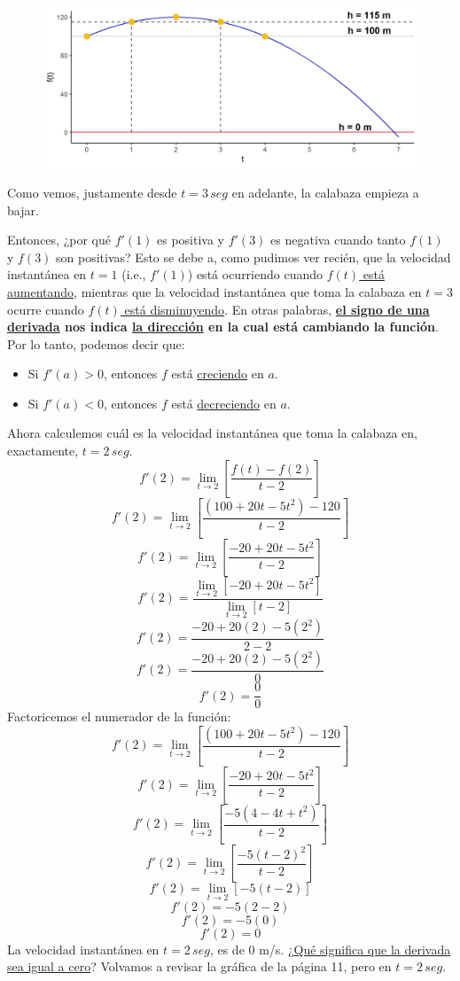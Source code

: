 \documentclass[12pt]{article}
\begin{document}
\begin{figure}[hbt!]
\centering
\includegraphics[scale=0.7]{img/tirar_calabaza_plot.jpg}
\end{figure}

Como vemos, justamente desde $t = 3 \, seg$ en adelante, la calabaza empieza a bajar.

Entonces, ¿por qué $f'(1)$ es positiva y $f'(3)$ es negativa cuando tanto $f(1)$ y $f(3)$ son positivas? Esto se debe a, como pudimos ver recién, que la velocidad instantánea en $t = 1$ (i.e., $f'(1)$) está ocurriendo cuando \underline{$f(t)$ está aumentando}, mientras que la velocidad instantánea que toma la calabaza en $t = 3$ ocurre cuando \underline{$f(t)$ está disminuyendo}. En otras palabras, \textbf{\underline{el signo de una derivada} nos indica \underline{la dirección} en la cual está cambiando la función}. Por lo tanto, podemos decir que:

\begin{itemize}
\item Si $f'(a) > 0$, entonces $f$ está \underline{creciendo} en $a$.
\item Si $f'(a) < 0$, entonces $f$ está \underline{decreciendo} en $a$.
\end{itemize}

Ahora calculemos cuál es la velocidad instantánea que toma la calabaza en, exactamente, $t = 2 \, seg$.
\[f'(2) = \lim_{t \to 2} \left[\frac{f(t) - f(2)}{t - 2}\right]\]
\[f'(2) = \lim_{t \to 2} \left[\frac{(100 + 20t - 5t^{2}) - 120}{t - 2}\right]\]
\[f'(2) = \lim_{t \to 2} \left[\frac{-20 + 20t - 5t^{2}}{t - 2}\right]\]
\[f'(2) = \frac{\lim_{t \to 2} [-20 + 20t - 5t^{2}]}{\lim_{t \to 2} [t - 2]}\]
\[f'(2) = \frac{-20 + 20(2) - 5(2^{2})}{2 - 2}\]
\[f'(2) = \frac{-20 + 20(2) - 5(2^{2})}{0}\]
\[f'(2) = \frac{0}{0}\]
Factoricemos el numerador de la función:
\[f'(2) = \lim_{t \to 2} \left[\frac{(100 + 20t - 5t^{2}) - 120}{t - 2}\right]\]
\[f'(2) = \lim_{t \to 2} \left[\frac{-20 + 20t - 5t^{2}}{t - 2}\right]\]
\[f'(2) = \lim_{t \to 2} \left[\frac{-5(4 - 4t + t^{2})}{t - 2}\right]\]
\[f'(2) = \lim_{t \to 2} \left[\frac{-5(t - 2)^{2}}{t - 2}\right]\]
\[f'(2) = \lim_{t \to 2} [-5(t - 2)]\]
\[f'(2) = -5(2 - 2)\]
\[f'(2) = -5(0)\]
\[f'(2) = 0\]
La velocidad instantánea en $t = 2 \, seg$, es de 0 m/s. ¿\underline{Qué significa que la derivada sea igual a cero}? Volvamos a revisar la gráfica de la página 11, pero en $t = 2 \, seg$.
\end{document}
